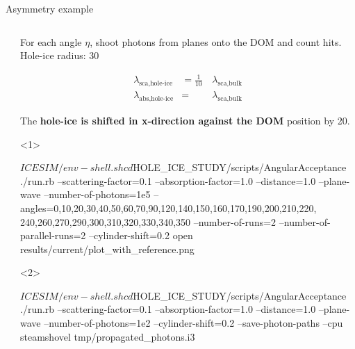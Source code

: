 
\begin{frame}[fragile]{Asymmetry example}

  \begin{columns}
    \begin{column}{0.5\textwidth}


    \end{column}
    \begin{column}{0.5\textwidth}

      For each angle $\eta$, shoot photons from planes onto the DOM and count hits.
      \small{Hole-ice radius: 30\cm}

      \begin{equation*}\begin{align}
        \lambda_\text{sca,hole-ice} &= \frac{1}{10}\, & \lambda_\text{sca,bulk} \\
        \lambda_\text{abs,hole-ice} &= & \lambda_\text{sca,bulk}
      \end{align}\end{equation*}

      The \textbf{hole-ice is shifted in x-direction against the DOM} position by 20\cm.

      \begin{onlyenv}<1>
        \begin{smallbash}
          $ICESIM/env-shell.sh
          cd $HOLE_ICE_STUDY/scripts/AngularAcceptance
          ./run.rb --scattering-factor=0.1 --absorption-factor=1.0 --distance=1.0 --plane-wave --number-of-photons=1e5 --angles=0,10,20,30,40,50,60,70,90,120,140,150,160,170,190,200,210,220, 240,260,270,290,300,310,320,330,340,350 --number-of-runs=2 --number-of-parallel-runs=2 --cylinder-shift=0.2
          open results/current/plot_with_reference.png
        \end{smallbash}
      \end{onlyenv}

      \begin{onlyenv}<2>
        \begin{bash}
          $ICESIM/env-shell.sh
          cd $HOLE_ICE_STUDY/scripts/AngularAcceptance
          ./run.rb --scattering-factor=0.1 --absorption-factor=1.0 --distance=1.0 --plane-wave --number-of-photons=1e2 --cylinder-shift=0.2 --save-photon-paths --cpu
          steamshovel tmp/propagated_photons.i3
        \end{bash}
      \end{onlyenv}

    \end{column}
  \end{columns}


\end{frame}

